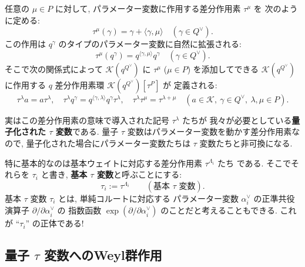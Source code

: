 \documentclass[12pt,twoside,dvipdfm]{msjproc}
\theoremstyle{definition} %
\theoremstyle{definition} %
\theoremstyle{definition} %
\numberwithin{theorem}{section}
\numberwithin{equation}{section}
\numberwithin{figure}{section}
\numberwithin{table}{section}
\newcommand\bra{\langle}
\newcommand\ket{\rangle}
\newcommand\K{\mathcal{K}}
\newcommand\av{\alpha^\vee}
\newcommand\Qv{{Q^\vee}}
\begin{document}
任意の $\mu\in P$ に対して, 
パラメーター変数に作用する差分作用素 $\tau^\mu$ を
次のように定める:
\begin{equation*}
  \tau^\mu(\gamma) = \gamma + \bra\gamma,\mu\ket
  \quad (\gamma\in\Qv).
\end{equation*}
この作用は $q^\gamma$ のタイプのパラメーター変数に自然に拡張される:
\begin{equation*}
  \tau^\mu(q^\gamma) = q^{\bra\gamma,\mu\ket}q^\gamma
  \quad (\gamma\in\Qv).
\end{equation*}
そこで次の関係式によって $\K(q^\Qv)$ に $\tau^\mu$ ($\mu\in P$)
を添加してできる $\K(q^\Qv)$ に作用する $q$ 差分作用素環 $\K(q^\Qv)[\tau^P]$ が
定義される:
\begin{equation*}
 \tau^\lambda a = a \tau^\lambda, \quad
 \tau^\lambda q^\gamma = q^{\bra\gamma,\lambda\ket} q^\gamma \tau^\lambda, \quad
 \tau^\lambda \tau^\mu = \tau^{\lambda+\mu} \quad
 (a\in\K,\ \gamma\in\Qv,\ \lambda,\mu\in P).
\end{equation*}

実はこの差分作用素の意味で導入された記号 $\tau^\lambda$ たちが
我々が必要としている{\bf 量子化された $\tau$ 変数}である.
量子 $\tau$ 変数はパラメーター変数を動かす差分作用素なので, 
量子化された場合にパラメーター変数たちは $\tau$ 変数たちと非可換になる. 

特に基本的なのは基本ウェイトに対応する差分作用素 $\tau^{\Lambda_i}$ たち
である.  そこでそれらを $\tau_i$ と書き, 
{\bf 基本 $\tau$ 変数}と呼ぶことにする:
\begin{equation*}
  \tau_i := \tau^{\Lambda_i}  \qquad
 (\text{基本 $\tau$ 変数}).
\end{equation*}
基本 $\tau$ 変数 $\tau_i$ とは, 単純コルートに対応する
パラメーター変数 $\av_i$ の正準共役演算子 $\partial/\partial\av_i$ の
指数函数 $\exp(\partial/\partial\av_i)$ のことだと考えることもできる.
これが ``$\tau_i$'' の正体である!




\subsection{量子 $\tau$ 変数へのWeyl群作用}
\label{sec:tau-Weyl}
\end{document}
